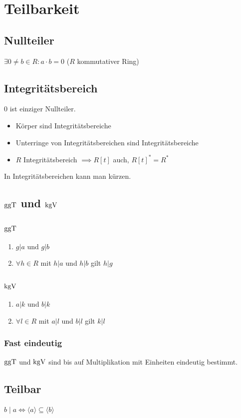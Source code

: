 \section*{Teilbarkeit}

\subsection*{Nullteiler}
$\exists 0 \neq b\in R: a\cdot b = 0$
($R$ kommutativer Ring)

\subsection*{Integritätsbereich}
$0$ ist einziger Nullteiler.

\begin{itemize}
	\item Körper sind Integritätsbereiche
	\item Unterringe von Integritätsbereichen sind Integritätsbereiche
	\item $R$ Integritätsbereich $\implies R[t]$ auch, $R[t]^* = R^*$
\end{itemize}

In Integritätsbereichen kann man kürzen.

\subsection*{$\operatorname{ggT}$ und $\operatorname{kgV}$}

\subsubsection*{$\operatorname{ggT}$}
\begin{enumerate}
	\item $g | a$ und $g | b$
	\item $\forall h \in R$ mit $h | a$ und $h | b$ gilt $h | g$
\end{enumerate}

\subsubsection*{$\operatorname{kgV}$}
\begin{enumerate}
	\item $a | k$ und $b | k$
	\item $\forall l \in R$ mit $a | l$ und $b | l$ gilt $k | l$
\end{enumerate}

\subsubsection*{Fast eindeutig}
$\operatorname{ggT}$ und $\operatorname{kgV}$ sind bis auf Multiplikation mit Einheiten eindeutig bestimmt.

\subsection*{Teilbar}
$b \mid a \iff \langle a \rangle \subseteq \langle b \rangle$
